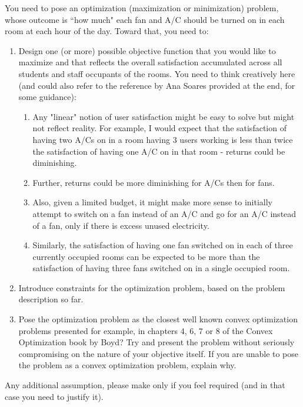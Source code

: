 \documentclass[a4paper]{article}
\begin{document}
You need to pose an optimization (maximization or minimization) problem, whose outcome is ``how much" each fan and A/C should be turned on in each room at each hour of the day. Toward that, you need to:

\begin{enumerate} 

\item Design one (or more) possible objective function that you would like to maximize and that reflects the overall satisfaction accumulated across all students and staff occupants of the rooms. You need to think creatively here (and could also refer to the reference by Ana Soares provided at the end, for some guidance):
\begin{enumerate} 

\item Any "linear" notion of user satisfaction might be easy to solve but might not reflect reality. For example, I would expect that the satisfaction of having two A/Cs on in a room having 3 users working is less than twice the satisfaction of having one A/C on in that room - returns could be diminishing. 
\item Further, returns could be more diminishing for A/Cs then for fans.  
\item Also, given a limited budget, it might make more sense to initially attempt to switch on a fan instead of an A/C and go for an A/C instead of a fan, only if there is excess unused electricity. 
\item Similarly, the satisfaction of having one fan switched on in each of three currently occupied rooms can be expected to be more than the satisfaction of having three fans switched on in a single occupied room. 
\end{enumerate}

\item Introduce constraints for the optimization problem, based on the problem description so far.
\item Pose the optimization problem as the closest well known convex optimization problems presented for example, in chapters 4, 6, 7 or 8 of the Convex Optimization book by Boyd? Try and present the problem without seriously compromising on the nature of your objective itself. If you are unable to pose the problem as a convex optimization problem, explain why. 
\end{enumerate} 

Any additional assumption, please make only if you feel required (and in that case you need to justify it).
\end{document}
